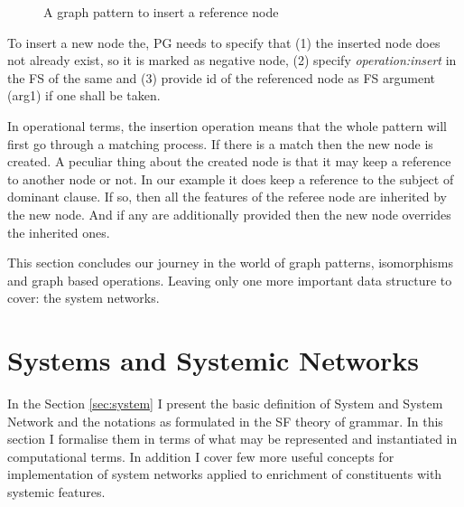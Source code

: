 \begin{figure}[H]
\centering
{}
\caption{A graph pattern to insert a reference node}
\label{fig:gp5}
\end{figure}


To insert a new node the, PG needs to specify that (1) the inserted node does not already exist, so it is marked as negative node, (2) specify \textit{operation:insert} in the FS of the same and (3) provide id of the referenced node as FS argument (arg1) if one shall be taken.

In operational terms, the insertion operation means that the whole pattern will first go through a matching process. If there is a match then the new node is created. A peculiar thing about the created node is that it may keep a reference to another node or not. In our example it does keep a reference to the subject of dominant clause. If so, then all the features of the referee node are inherited by the new node. And if any are additionally provided then the new node overrides the inherited ones.

This section concludes our journey in the world of graph patterns, isomorphisms and graph based operations. Leaving only one more important data structure to cover: the system networks. 

\section{Systems and Systemic Networks}
In the Section \ref{sec:system} I present the basic definition of System and System Network and the notations as formulated in the SF theory of grammar. In this section I formalise them in terms of what may be represented and instantiated in computational terms. In addition I cover few more useful concepts for implementation of system networks applied to enrichment of constituents with systemic features. 

